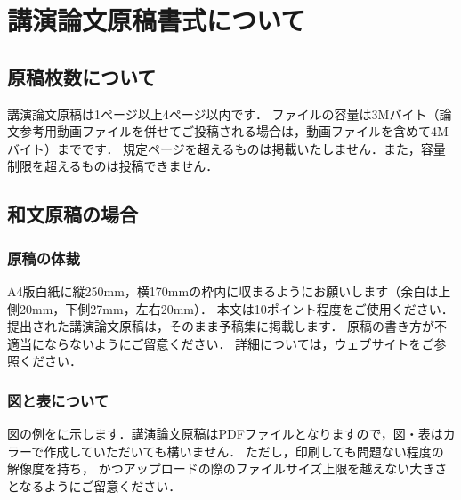 \section{講演論文原稿書式について}
\subsection{原稿枚数について}
講演論文原稿は1ページ以上4ページ以内です．
ファイルの容量は3Mバイト（論文参考用動画ファイルを併せてご投稿される場合は，動画ファイルを含めて4Mバイト）までです．
規定ページを超えるものは掲載いたしません．また，容量制限を超えるものは投稿できません．

\subsection{和文原稿の場合}
\subsubsection{原稿の体裁}
A4版白紙に縦250mm，横170mmの枠内に収まるようにお願いします（余白は上側20mm，下側27mm，左右20mm）．
本文は10ポイント程度をご使用ください．
提出された講演論文原稿は，そのまま予稿集に掲載します．
原稿の書き方が不適当にならないようにご留意ください．
詳細については，ウェブサイト\cite{website}をご参照ください．

\subsubsection{図と表について}
図の例をに示します．講演論文原稿はPDFファイルとなりますので，図・表はカラーで作成していただいても構いません．
ただし，印刷しても問題ない程度の解像度を持ち，
かつアップロードの際のファイルサイズ上限を越えない大きさとなるようにご留意ください．


